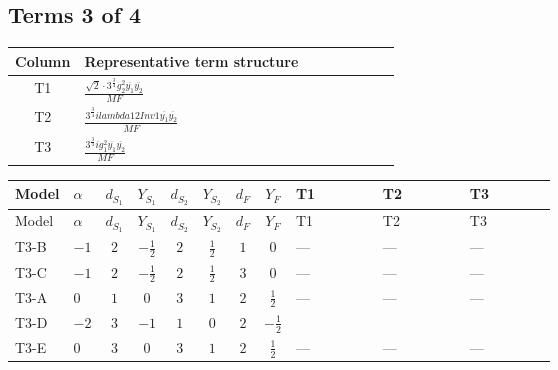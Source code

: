 \documentclass[8pt]{article}
\begin{document}
\begin{landscape}
\subsection*{Terms 3 of 4}
\begin{center}
\begin{tabular}{@{}c >{\raggedright\arraybackslash}p{0.82\linewidth}@{}}
\toprule
Column & Representative term structure \\
\midrule
T1 & \(\displaystyle \frac{\sqrt{2} \cdot 3^{\frac{3}{4}} g_{2}^{2} \overline{y_{1}} \overline{y_{2}}}{MF}\) \\
\midrule
T2 & \(\displaystyle \frac{3^{\frac{3}{4}} i lambda12Inv1 \overline{y_{1}} \overline{y_{2}}}{MF}\) \\
\midrule
T3 & \(\displaystyle \frac{3^{\frac{3}{4}} i g_{1}^{2} \overline{y_{1}} \overline{y_{2}}}{MF}\) \\
\midrule
\bottomrule
\end{tabular}
\end{center}
\smallskip
\tiny
\begin{longtable}{@{}llcccccc >{\raggedright\arraybackslash}p{0.21\linewidth} >{\raggedright\arraybackslash}p{0.21\linewidth} >{\raggedright\arraybackslash}p{0.21\linewidth}@{}}
\toprule
Model & $\alpha$ & $d_{S_1}$ & $Y_{S_1}$ & $d_{S_2}$ & $Y_{S_2}$ & $d_F$ & $Y_F$ & T1 & T2 & T3 \\
\midrule
\endfirsthead
\toprule
Model & $\alpha$ & $d_{S_1}$ & $Y_{S_1}$ & $d_{S_2}$ & $Y_{S_2}$ & $d_F$ & $Y_F$ & T1 & T2 & T3 \\
\midrule
\endhead
T3-B & $-1$ & $2$ & $-\frac{1}{2}$ & $2$ & $\frac{1}{2}$ & $1$ & $0$ & --- & --- & --- \\
\midrule
T3-C & $-1$ & $2$ & $-\frac{1}{2}$ & $2$ & $\frac{1}{2}$ & $3$ & $0$ & --- & --- & --- \\
\midrule
T3-A & $0$ & $1$ & $0$ & $3$ & $1$ & $2$ & $\frac{1}{2}$ & --- & --- & --- \\
\midrule
T3-D & $-2$ & $3$ & $-1$ & $1$ & $0$ & $2$ & $-\frac{1}{2}$ & \scriptsize\adjustbox{max width=\linewidth}{$\begin{gathered} - \frac{\sqrt{2} \cdot 3^{\frac{3}{4}} g_{2}^{2} \overline{y_{1}} \overline{y_{2}}}{6 MF}\end{gathered}$} & \scriptsize\adjustbox{max width=\linewidth}{$\begin{gathered} \frac{3^{\frac{3}{4}} i lambda12Inv1 \overline{y_{1}} \overline{y_{2}}}{6 MF}\end{gathered}$} & \scriptsize\adjustbox{max width=\linewidth}{$\begin{gathered} \frac{3^{\frac{3}{4}} i g_{1}^{2} \overline{y_{1}} \overline{y_{2}}}{8 MF}\end{gathered}$} \\
\midrule
T3-E & $0$ & $3$ & $0$ & $3$ & $1$ & $2$ & $\frac{1}{2}$ & --- & --- & --- \\
\midrule
\bottomrule
\end{longtable}
\clearpage

\end{landscape}
\end{document}
